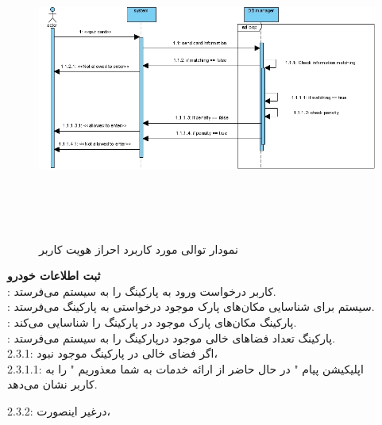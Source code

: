 \documentclass[oneside,a4paper,12pt]{book}
\begin{document}
\begin{figure}
	\begin{center}
		\includegraphics[height=10cm, width=15cm]{UC1 - Copy.jpg}
		\caption{نمودار توالی مورد کاربرد احراز هویت کاربر}
	\end{center}
\end{figure}

\vspace{6cm}
\noindent\textbf{ ثبت اطلاعات خودرو}\\

:	کاربر درخواست ورود به پارکینگ را به سیستم می‌فرستد.\\

:  سیستم برای شناسایی مکان‌های پارک موجود درخواستی به پارکینگ می‌فرستد.\\

: پارکینگ مکان‌های پارک موجود در پارکینگ را شناسایی می‌کند.\\

: پارکینگ تعداد فضاهای خالی موجود درپارکینگ را به سیستم می‌فرستد.\\

2.3.1: اگر فضای خالی در پارکینگ موجود نبود، \\

\hspace{1cm} 2.3.1.1: اپلیکیشن پیام " در حال حاضر از ارائه خدمات به شما معذوریم " را به\\[-0.5cm]

\hspace{2.5cm}  کاربر نشان می‌دهد.

2.3.2: درغیر اینصورت،\\
\end{document}

